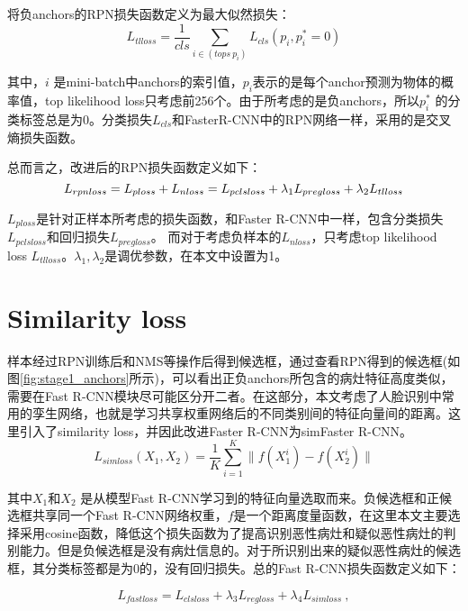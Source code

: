 将负anchors的RPN损失函数定义为最大似然损失：
\begin{equation}
L_{tlloss}=\frac{1}{cls}\sum_{i\in(tops \  p_{i})}L_{cls}(p_{i},p_{i}^{*}=0)
\label{eq1}
\end{equation}

其中，$i$ 是mini-batch中anchors的索引值，$p_{i}$表示的是每个anchor预测为物体的概率值，top likelihood loss只考虑前256个。由于所考虑的是负anchors，所以$p_{i}^{*}$ 的分类标签总是为0。分类损失$L_{cls}$和FasterR-CNN中的RPN网络一样，采用的是交叉熵损失函数。

总而言之，改进后的RPN损失函数定义如下：
\begin{equation}
L_{rpnloss}=L_{ploss} + L_{nloss}= \\
        L_{pclsloss} + {\lambda_1}L_{pregloss} +{\lambda_2}L_{tlloss}
\end{equation}

$L_{ploss}$是针对正样本所考虑的损失函数，和Faster R-CNN中一样，包含分类损失$L_{pclsloss}$和回归损失$L_{pregloss}$。
而对于考虑负样本的$L_{nloss}$，只考虑top likelihood loss $L_{tlloss}$。$\lambda_1,\lambda_2$是调优参数，在本文中设置为1。

\section{Similarity loss}
样本经过RPN训练后和NMS\cite{hosang2017learning}等操作后得到候选框，通过查看RPN得到的候选框(如图\ref{fig:stage1_anchors}所示)，可以看出正负anchors所包含的病灶特征高度类似，需要在Fast R-CNN模块尽可能区分开二者。在这部分，本文考虑了人脸识别中常用的孪生网络，也就是学习共享权重网络后的不同类别间的特征向量间的距离。这里引入了similarity loss，并因此改进Faster R-CNN为simFaster R-CNN。
\begin{equation}
L_{simloss}(X_1,X_2)=\frac{1}{K}\sum_{i=1}^{K}\lVert{f(X_1^i)-f(X_2^i)}\rVert
\end{equation}

其中$X_1$和$X_2$ 是从模型Fast R-CNN学习到的特征向量选取而来。负候选框和正候选框共享同一个Fast R-CNN网络权重，$f$是一个距离度量函数，在这里本文主要选择采用cosine函数，降低这个损失函数为了提高识别恶性病灶和疑似恶性病灶的判别能力。但是负候选框是没有病灶信息的。对于所识别出来的疑似恶性病灶的候选框，其分类标签都是为0的，没有回归损失。总的Fast R-CNN损失函数定义如下：

\begin{equation}
L_{fastloss}=L_{clsloss} + {\lambda_3}L_{regloss} +{\lambda_4}L_{simloss}~,
\end{equation}

